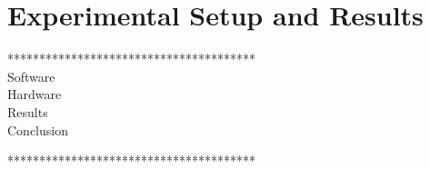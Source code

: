 \chapter{Experimental Setup and Results}
***************************************\\
Software\\
Hardware\\
Results\\
Conclusion

***************************************\\